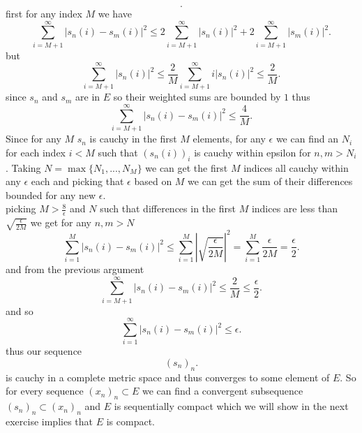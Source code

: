 \documentclass[11pt]{article}
\begin{document}
{\[.\] 
first for any index $M$ we have
\[
\sum_{i=M+1}^{\infty}|s_n(i) - s_m(i)|^2 \le 2\sum_{i=M+1}^{\infty}|s_n(i)|^2 + 2\sum_{i=M+1}^{\infty}|s_m(i)|^2
.\] 
but
\[
\sum_{i=M+1}^{\infty}|s_n(i)|^2 \le \frac{2}{M}\sum_{i=M+1}^{\infty}i|s_n(i)|^2 \le \frac{2}{M}
.\] 
since $s_n$ and $s_m$ are in $E$ so their weighted sums are bounded by $1$ thus
\[
\sum_{i=M+1}^{\infty}|s_n(i)-s_m(i)|^2 \le \frac{4}{M}
.\] 
Since for any $M$ $s_n$ is cauchy in the first $M$ elements, for any $\epsilon$ we can find an $N_i$ for each index
$i < M$ such that $(s_n(i))_i$ is cauchy within epsilon for  $n,m > N_i$. Taking $N = \max\{N_1,...,N_M\}$ we can get the first $M$ indices
all cauchy within any $\epsilon$ each and picking that $\epsilon$ based on $M$ we can get the sum of their differences bounded for any new $\epsilon$.\\
picking $M > \frac{8}{\epsilon}$ and $N$ such that differences in the first $M$ indices are less than $\sqrt{\frac{\epsilon}{2M}}$ we get for any $n,m > N$
\[
\sum_{i=1}^{M}|s_n(i)-s_m(i)|^2 \le \sum_{i=1}^{M}|\sqrt{\frac{\epsilon}{2M}}|^2 = \sum_{i=1}^{M}\frac{\epsilon}{2M} = \frac{\epsilon}{2}
.\] 
and from the previous argument
\[
\sum_{i=M+1}^{\infty}|s_n(i)-s_m(i)|^2 \le \frac{2}{M} \le  \frac{\epsilon}{2}
.\] 
and so
\[
\sum_{i=1}^{\infty}|s_n(i)-s_m(i)|^2 \le \epsilon
.\] 
thus our sequence
\[
    (s_n)_n
.\] 
is cauchy in a complete metric space and thus converges to some element of $E$. So for every sequence $(x_n)_n \subset E$ we can find a convergent subsequence
$(s_n)_n \subset (x_n)_n$ and $E$ is sequentially compact which we will show in the next exercise implies that $E$ is compact.
}
\end{document}

